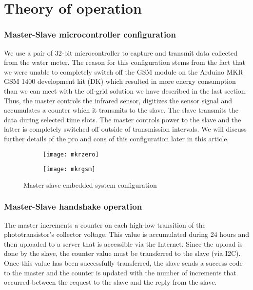

\section{Theory of operation}
\label{sec:Too}


\subsubsection{Master-Slave microcontroller configuration}

We use a pair of 32-bit microcontroller to capture and transmit data collected from the water meter.
The reason for this configuration stems from the fact that we were unable to completely switch off the GSM module on the
Arduino MKR GSM 1400 development kit (DK) which resulted in more energy consumption than we can meet with the off-grid solution
we have described in the last
section.
Thus, the master controls the infrared sensor, digitizes the sensor signal and accumulates a counter which it transmits to the
slave. The slave
transmits the data during selected time slots. The master controls power to the slave and the latter
is completely switched off outside of transmission intervals. We will discuss further details of the pro and cons of this configuration later in
this article.



\begin{figure}[h]
    \centering
    \begin{subfigure}[b]{0.45\textwidth}
        \centering
        \texttt{[image: mkrzero]}
        \label{fig:x}
    \end{subfigure}
    \hfill
    \begin{subfigure}[b]{0.45\textwidth}
        \centering
        \texttt{[image: mkrgsm]}
        \label{fig:x}
    \end{subfigure}
    \caption{Master slave embedded system configuration}
    \label{fig:x}
\end{figure}
\subsubsection{Master-Slave handshake operation}

The master increments a counter on each high-low transition of the phototransistor's collector voltage.
This value is accumulated during 24 hours and then uploaded to a server that is accessible via the Internet.
Since the upload is done by the slave, the counter value must be transferred to the slave (via I2C).
Once this value has been successfully transferred, the slave sends a success code to the master and the counter
is updated with the number of increments that  occurred between the request to the slave and the reply from the slave.
\par

